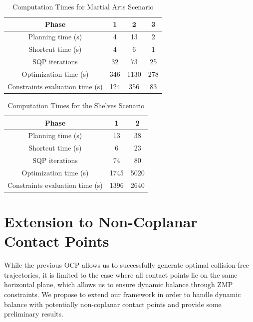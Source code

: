 \begin{table}
  \renewcommand{\arraystretch}{1.3}
  \caption{Computation Times for Martial Arts Scenario}
  \label{table-martial-art}
  \centering
  \begin{tabular}{|c||c|c|c|}
    \hline
    Phase & 1 & 2 & 3 \\
    \hline
    Planning time (s) & 4 & 13 & 2 \\
    \hline
    Shortcut time (s) & 4 & 6 & 1 \\
    \hline
    SQP iterations & 32 & 73 & 25 \\
    \hline
    Optimization time (s) & 346 & 1130 & 278 \\
    \hline
    Constraints evaluation time (s) & 124 & 356 & 83 \\
    \hline
  \end{tabular}
\end{table}

\begin{table}
  \renewcommand{\arraystretch}{1.3}
  \caption{Computation Times for the Shelves Scenario}
  \label{table-shelves}
  \centering
  \begin{tabular}{|c||c|c|}
    \hline
    Phase & 1 & 2 \\
    \hline
    Planning time (s) & 13 & 38 \\
    \hline
    Shortcut time (s) & 6 & 23 \\
    \hline
    SQP iterations & 74 & 80 \\
    \hline
    Optimization time (s) & 1745 & 5020 \\
    \hline
    Constraints evaluation time (s) & 1396 & 2640 \\
    \hline
  \end{tabular}
\end{table}

\section{Extension to Non-Coplanar Contact Points}
\label{sec:chap3-noncoplanar-contact-points}

While the previous OCP allows us to successfully generate optimal
collision-free trajectories, it is limited to the case where all
contact points lie on the same horizontal plane, which allows us to
ensure dynamic balance through ZMP constraints. We propose to extend
our framework in order to handle dynamic balance with potentially
non-coplanar contact points and provide some preliminary results.


